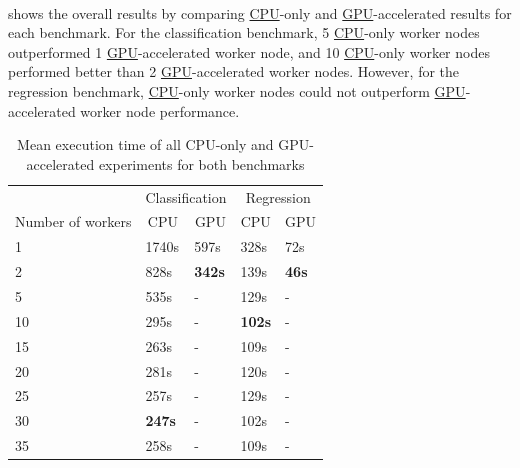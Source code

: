 \paragraph{}
 shows the overall results by comparing \hyperlink{abbr:cpu}{CPU}-only and \hyperlink{abbr:gpu}{GPU}-accelerated results for each benchmark.
For the classification benchmark, 5 \hyperlink{abbr:cpu}{CPU}-only worker nodes outperformed 1 \hyperlink{abbr:gpu}{GPU}-accelerated worker node, and 10 \hyperlink{abbr:cpu}{CPU}-only worker nodes performed better than 2 \hyperlink{abbr:gpu}{GPU}-accelerated worker nodes.
However, for the regression benchmark, \hyperlink{abbr:cpu}{CPU}-only worker nodes could not outperform \hyperlink{abbr:gpu}{GPU}-accelerated worker node performance.
\begin{table}[ht]
\centering
\begin{tabular}{@{}l|ll|ll@{}}
\toprule
                  & \multicolumn{2}{c|}{Classification}                & \multicolumn{2}{c}{Regression}                    \\
Number of workers & \multicolumn{1}{c}{CPU} & \multicolumn{1}{c|}{GPU} & \multicolumn{1}{c}{CPU} & \multicolumn{1}{c}{GPU} \\ \midrule
1  & 1740s         & 597s          & 328s          & 72s \\
2  & 828s          & \textbf{342s} & 139s          & \textbf{46s} \\
5  & 535s          & -             & 129s          & -     \\
10 & 295s          & -             & \textbf{102s} & -     \\
15 & 263s          & -             & 109s          & -     \\
20 & 281s          & -             & 120s          & -     \\
25 & 257s          & -             & 129s          & -     \\
30 & \textbf{247s} & -             & 102s          & -     \\
35 & 258s          & -             & 109s          & -     \\ \bottomrule
\end{tabular}
\caption{Mean execution time of all CPU-only and GPU-accelerated experiments for both benchmarks}
\label{table:07_gpu_overall_results}
\end{table}
\newpage


